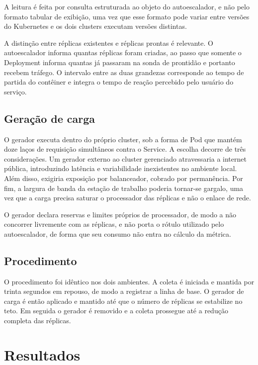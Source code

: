 \documentclass[12pt]{article}
\begin{document}
A leitura é feita por consulta estruturada ao objeto do autoescalador, e não
pelo formato tabular de exibição, uma vez que esse formato pode variar entre
versões do Kubernetes e os dois clusters executam versões distintas.

A distinção entre réplicas existentes e réplicas prontas é relevante. O
autoescalador informa quantas réplicas foram criadas, ao passo que somente o
Deployment informa quantas já passaram na sonda de prontidão e portanto recebem
tráfego. O intervalo entre as duas grandezas corresponde ao tempo de partida do
contêiner e integra o tempo de reação percebido pelo usuário do serviço.

\subsection{Geração de carga}

O gerador executa dentro do próprio cluster, sob a forma de Pod que mantém doze
laços de requisição simultâneos contra o Service. A escolha decorre de três
considerações. Um gerador externo ao cluster gerenciado atravessaria a internet
pública, introduzindo latência e variabilidade inexistentes no ambiente local.
Além disso, exigiria exposição por balanceador, cobrado por permanência. Por fim,
a largura de banda da estação de trabalho poderia tornar-se gargalo, uma vez que
a carga precisa saturar o processador das réplicas e não o enlace de rede.

O gerador declara reservas e limites próprios de processador, de modo a não
concorrer livremente com as réplicas, e não porta o rótulo utilizado pelo
autoescalador, de forma que seu consumo não entra no cálculo da métrica.

\subsection{Procedimento}

O procedimento foi idêntico nos dois ambientes. A coleta é iniciada e mantida
por trinta segundos em repouso, de modo a registrar a linha de base. O gerador
de carga é então aplicado e mantido até que o número de réplicas se estabilize
no teto. Em seguida o gerador é removido e a coleta prossegue até a redução
completa das réplicas.

\section{Resultados}
\end{document}
